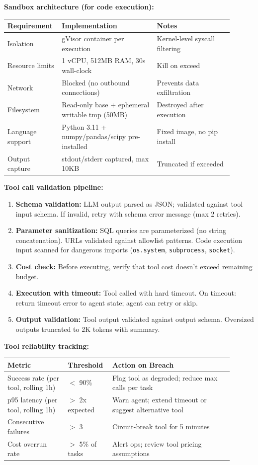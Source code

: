 \textbf{Sandbox architecture (for code execution):}

\begin{tabular}{|p{0.18\linewidth}|p{0.40\linewidth}|p{0.32\linewidth}|}
\hline
\textbf{Requirement} & \textbf{Implementation} & \textbf{Notes} \\
\hline
Isolation & gVisor container per execution & Kernel-level syscall filtering \\
\hline
Resource limits & 1 vCPU, 512MB RAM, 30s wall-clock & Kill on exceed \\
\hline
Network & Blocked (no outbound connections) & Prevents data exfiltration \\
\hline
Filesystem & Read-only base + ephemeral writable tmp (50MB) & Destroyed after execution \\
\hline
Language support & Python 3.11 + numpy/pandas/scipy pre-installed & Fixed image, no pip install \\
\hline
Output capture & stdout/stderr captured, max 10KB & Truncated if exceeded \\
\hline
\end{tabular}

\textbf{Tool call validation pipeline:}

\begin{enumerate}
  \item \textbf{Schema validation:} LLM output parsed as JSON; validated against tool input schema. If invalid, retry with schema error message (max 2 retries).
  \item \textbf{Parameter sanitization:} SQL queries are parameterized (no string concatenation). URLs validated against allowlist patterns. Code execution input scanned for dangerous imports (\texttt{os.system}, \texttt{subprocess}, \texttt{socket}).
  \item \textbf{Cost check:} Before executing, verify that tool cost doesn't exceed remaining budget.
  \item \textbf{Execution with timeout:} Tool called with hard timeout. On timeout: return timeout error to agent state; agent can retry or skip.
  \item \textbf{Output validation:} Tool output validated against output schema. Oversized outputs truncated to 2K tokens with summary.
\end{enumerate}

\textbf{Tool reliability tracking:}

\begin{tabular}{|p{0.25\linewidth}|p{0.15\linewidth}|p{0.50\linewidth}|}
\hline
\textbf{Metric} & \textbf{Threshold} & \textbf{Action on Breach} \\
\hline
Success rate (per tool, rolling 1h) & $<$ 90\% & Flag tool as degraded; reduce max calls per task \\
\hline
p95 latency (per tool, rolling 1h) & $>$ 2x expected & Warn agent; extend timeout or suggest alternative tool \\
\hline
Consecutive failures & $>$ 3 & Circuit-break tool for 5 minutes \\
\hline
Cost overrun rate & $>$ 5\% of tasks & Alert ops; review tool pricing assumptions \\
\hline
\end{tabular}


